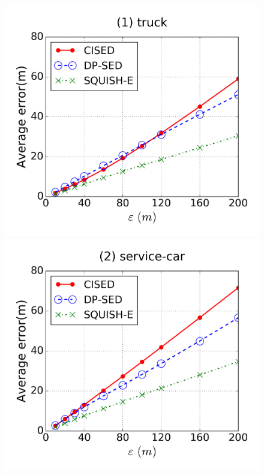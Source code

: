 \begin{figure}[tb]
\centering
\includegraphics[scale = 0.25]{figures/Exp-error-epsilon-truck.png}
\includegraphics[scale = 0.25]{figures/Exp-error-epsilon-service.png}

\end{figure}
